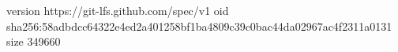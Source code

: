 version https://git-lfs.github.com/spec/v1
oid sha256:58adbdcc64322e4ed2a401258bf1ba4809c39c0bac44da02967ac4f2311a0131
size 349660
